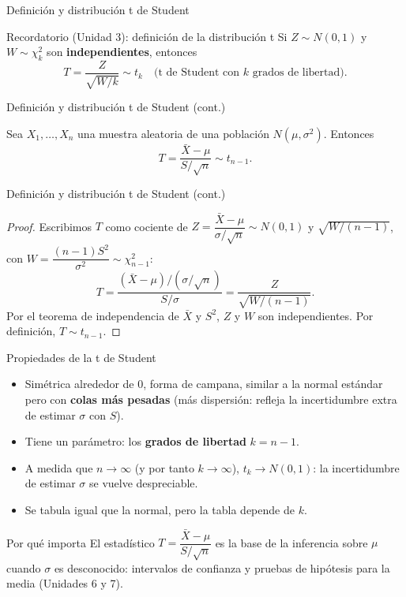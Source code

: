 \documentclass[aspectratio=169,11pt]{beamer}
\begin{document}
\begin{frame}{Definición y distribución t de Student}
\begin{block}{Recordatorio (Unidad 3): definición de la distribución t}
Si $Z\sim N(0,1)$ y $W\sim \chi^2_k$ son \textbf{independientes}, entonces
$$T = \frac{Z}{\sqrt{W/k}} \sim t_k \quad \text{(t de Student con $k$ grados de libertad)}.$$
\end{block}

\end{frame}

\begin{frame}{Definición y distribución t de Student (cont.)}
\begin{theorem}
Sea $X_1,\dots,X_n$ una muestra aleatoria de una población $N(\mu,\sigma^2)$. Entonces
$$T = \frac{\bar X-\mu}{S/\sqrt n} \sim t_{n-1}.$$
\end{theorem}

\end{frame}

\begin{frame}{Definición y distribución t de Student (cont.)}
\begin{proof}
Escribimos $T$ como cociente de $Z=\dfrac{\bar X-\mu}{\sigma/\sqrt n}\sim N(0,1)$ y $\sqrt{W/(n-1)}$, con $W=\dfrac{(n-1)S^2}{\sigma^2}\sim \chi^2_{n-1}$:
$$T = \frac{(\bar X-\mu)/(\sigma/\sqrt n)}{S/\sigma} = \frac{Z}{\sqrt{W/(n-1)}}.$$
Por el teorema de independencia de $\bar X$ y $S^2$, $Z$ y $W$ son independientes. Por definición, $T\sim t_{n-1}$. \qedhere
\end{proof}
\end{frame}

\begin{frame}{Propiedades de la t de Student}
\begin{itemize}
\item Simétrica alrededor de $0$, forma de campana, similar a la normal estándar pero con \textbf{colas más pesadas} (más dispersión: refleja la incertidumbre extra de estimar $\sigma$ con $S$).
\item Tiene un parámetro: los \textbf{grados de libertad} $k=n-1$.
\item A medida que $n\to\infty$ (y por tanto $k\to\infty$), $t_k \to N(0,1)$: la incertidumbre de estimar $\sigma$ se vuelve despreciable.
\item Se tabula igual que la normal, pero la tabla depende de $k$.
\end{itemize}

\begin{alertblock}{Por qué importa}
El estadístico $T=\dfrac{\bar X-\mu}{S/\sqrt n}$ es la base de la inferencia sobre $\mu$ cuando $\sigma$ es desconocido: intervalos de confianza y pruebas de hipótesis para la media (Unidades 6 y 7).
\end{alertblock}
\end{frame}
\end{document}

